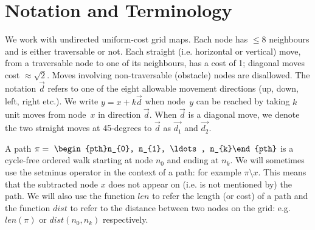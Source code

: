 \section{Notation and Terminology}
\label{sec:notation}
We work with undirected uniform-cost grid maps.  Each node has $\leq 8$
neighbours and is either traversable or not.  Each straight (i.e. horizontal or
vertical) move, from a traversable node to one of its neighbours, has a cost of
1; diagonal moves cost $\approx\sqrt 2$.  Moves involving non-traversable
(obstacle) nodes are disallowed.  The notation $\vec{d}$ refers to one of the
eight allowable movement directions (up, down, left, right etc.).  We write $y =
x + k\vec{d}$ when node~$y$ can be reached by taking $k$ unit moves from
node~$x$ in direction $\vec{d}$.  When $\vec{d}$ is a diagonal move, we denote
the two straight moves at 45-degrees to $\vec{d}$ as $\vec{d_1}$ and $\vec{d_2}$.

A path $\pi =~\begin{pth}n_{0}, n_{1}, \ldots , n_{k}\end{pth}$ is a cycle-free
ordered walk starting at node $n_{0}$ and ending at $n_{k}$.  We will sometimes
use the setminus operator in the context of a path: for example $\pi \setminus
x$. This means that the subtracted node $x$ does not appear on (i.e. is not
mentioned by) the path.  We will also use the function $len$ to refer the length
(or cost) of a path and the function $dist$ to refer to the distance between two
nodes on the grid: e.g. $len(\pi)$ or $dist(n_{0}, n_{k})$ respectively.  



